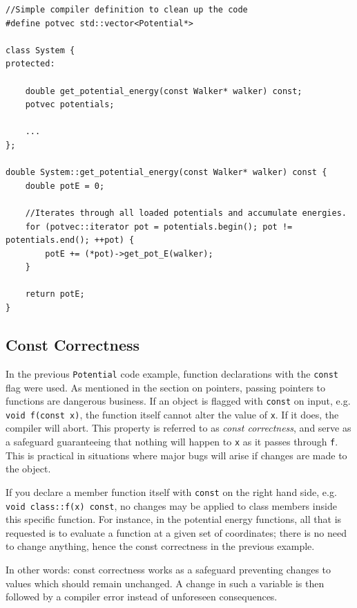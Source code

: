 \vspace{0.5cm}
\begin{lstlisting}
//Simple compiler definition to clean up the code
#define potvec std::vector<Potential*>

class System {
protected:

    double get_potential_energy(const Walker* walker) const;
    potvec potentials;
    
    ...
};

double System::get_potential_energy(const Walker* walker) const {
    double potE = 0;

    //Iterates through all loaded potentials and accumulate energies.
    for (potvec::iterator pot = potentials.begin(); pot != potentials.end(); ++pot) {
        potE += (*pot)->get_pot_E(walker);
    }

    return potE;
}
\end{lstlisting}

\subsection{Const Correctness}

In the previous \verb+Potential+ code example, function declarations with the \verb+const+ flag were used. As mentioned in the section on pointers, passing pointers to functions are dangerous business. If an object is flagged with \verb+const+ on input, e.g. \verb+void f(const x)+, the function itself cannot alter the value of \verb+x+. If it does, the compiler will abort. This property is referred to as \textit{const correctness}, and serve as a safeguard guaranteeing that nothing will happen to \verb+x+ as it passes through \verb+f+. This is practical in situations where major bugs will arise if changes are made to the object.

If you declare a member function itself with \verb+const+ on the right hand side, e.g. \verb+void class::f(x) const+, no changes may be applied to class members inside this specific function. For instance, in the potential energy functions, all that is requested is to evaluate a function at a given set of coordinates; there is no need to change anything, hence the const correctness in the previous example. 

In other words: const correctness works as a safeguard preventing changes to values which should remain unchanged. A change in such a variable is then followed by a compiler error instead of unforeseen consequences.

